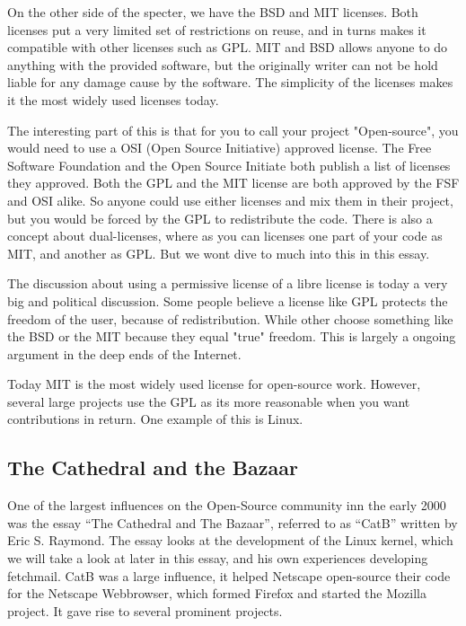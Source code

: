 \documentclass[12pt]{article}
\begin{document}
On the other side of the specter, we have the BSD and MIT licenses. Both
licenses put a very limited set of restrictions on reuse, and in turns makes it
compatible with other licenses such as GPL. MIT and BSD allows anyone to do
anything with the provided software, but the originally writer can not be hold
liable for any damage cause by the software. The simplicity of the licenses
makes it the most widely used licenses today.

The interesting part of this is that for you to call your project "Open-source",
you would need to use a OSI (Open Source Initiative) approved
license\cite{osi-license-list}. The Free Software Foundation and the Open Source
Initiate both publish a list of licenses they approved\cite{fsf-license-list}.
Both the GPL and the MIT license are both approved by the FSF and OSI alike. So
anyone could use either licenses and mix them in their project, but you would be
forced by the GPL to redistribute the code. There is also a concept about
dual-licenses, where as you can licenses one part of your code as MIT, and
another as GPL. But we wont dive to much into this in this essay.


The discussion about using a permissive license of a libre license is today a
very big and political discussion. Some people believe a license like GPL
protects the freedom of the user, because of redistribution. While other choose
something like the BSD or the MIT because they equal "true" freedom. This is
largely a ongoing argument in the deep ends of the Internet.

Today MIT is the most widely used license for open-source work. However, several
large projects use the GPL as its more reasonable when you want contributions in
return. One example of this is Linux.


\subsection{The Cathedral and the Bazaar}
One of the largest influences on the Open-Source community inn the early 2000
was the essay ``The Cathedral and The Bazaar'', referred to as ``CatB'' written
by Eric S. Raymond\cite{catb}.  The essay looks at the development of the Linux kernel,
which we will take a look at later in this essay, and his own experiences
developing fetchmail. CatB was a large influence, it helped Netscape open-source
their code for the Netscape Webbrowser, which formed Firefox and started the
Mozilla project. It gave rise to several prominent projects.
\end{document}
